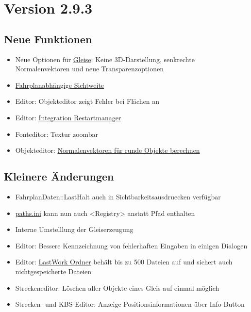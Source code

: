 \section{Version 2.9.3}
\subsection{Neue Funktionen}
\begin{itemize}
\item Neue Optionen für \hyperref[sec:editor-gleise]{Gleise}: Keine 3D-Darstellung, senkrechte Normalenvektoren und neue Transparenzoptionen
\item \hyperref[sec:sim-optionen-special]{Fahrplanabhängige Sichtweite}
\item Editor: Objekteditor zeigt Fehler bei Flächen an
\item Editor: \hyperref[sec:sec:editor-lastwork]{Integration Restartmanager}
\item Fonteditor: Textur zoombar
\item Objekteditor: \hyperref[sec:editor-obj-l3dobj-normalen]{Normalenvektoren für runde Objekte berechnen}
\end{itemize}
\subsection{Kleinere Änderungen}
\begin{itemize}
\item FahrplanDaten::LastHalt auch in Sichtbarkeitsausdruecken verfügbar
\item \hyperref[sec:sim-optionen-paths]{paths.ini} kann nun auch <Registry> anstatt Pfad enthalten
\item Interne Umstelllung der Gleiserzeugung
\item Editor: Bessere Kennzeichnung von fehlerhaften Eingaben in einigen Dialogen
\item Editor: \hyperref[sec:sec:editor-lastwork]{LastWork Ordner} behält bis zu 500 Dateien auf und sichert auch nichtgespeicherte Dateien
\item Streckeneditor: Löschen aller Objekte eines Gleis auf einmal möglich
\item Strecken- und KBS-Editor: Anzeige Positionsinformationen über Info-Button
\end{itemize}

